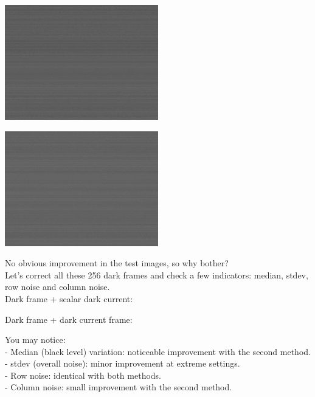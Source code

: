 \begin{center}
\includegraphics[height=5cm]{images/blackframes-gainx1-offset2047-5ms-01-darkcurrent-no-blackcol}
\end{center}

\begin{center}
\includegraphics[height=5cm]{images/blackframes-gainx1-offset2047-64ms-01-darkcurrent-no-blackcol}
\end{center}

No obvious improvement in the test images, so why bother?\\

Let's correct all these 256 dark frames and check a few indicators: median, stdev, row noise and column noise.\\ 

Dark frame + scalar dark current: 
\begin{center}
\end{center}


Dark frame + dark current frame:
\begin{center}
\end{center}

You may notice:\\

- Median (black level) variation: noticeable improvement with the second method.\\
- stdev (overall noise): minor improvement at extreme settings.\\
- Row noise: identical with both methods.\\
- Column noise: small improvement with the second method.\\

